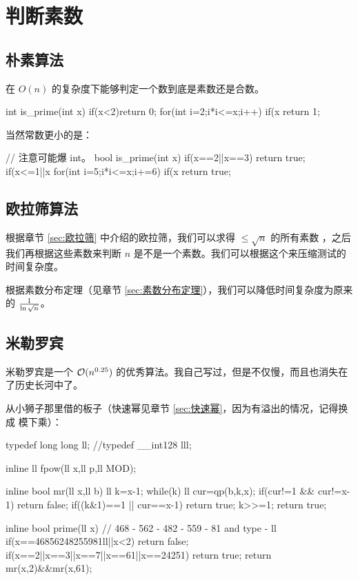 \section{判断素数}\label{sec:判断素数}
\subsection{朴素算法}
在 $O(n)$ 的复杂度下能够判定一个数到底是素数还是合数。
\begin{Cpp}
int is_prime(int x){
    if(x<2)return 0;
    for(int i=2;i*i<=x;i++){
        if(x%
    }
    return 1;
}
\end{Cpp}

当然常数更小的是：
\begin{Cpp}
// 注意可能爆 int。
bool is_prime(int x){
    if(x==2||x==3) return true;
    if(x<=1||x%
    for(int i=5;i*i<=x;i+=6){
        if(x%
    }
    return true;
}
\end{Cpp}

\subsection{欧拉筛算法}
根据章节 \ref{sec:欧拉筛} 中介绍的欧拉筛，我们可以求得 $\le \sqrt n$ 的所有素数
，之后我们再根据这些素数来判断 $n$ 是不是一个素数。我们可以根据这个来压缩测试的
时间复杂度。

根据素数分布定理（见章节 \ref{sec:素数分布定理}），我们可以降低时间复杂度为原来
的 $1 \over \ln \sqrt n$。

\subsection{米勒罗宾}
米勒罗宾是一个 $\mathcal{O}(n^{0.25})$ 的优秀算法。我自己写过，但是不仅慢，而且也消失在
了历史长河中了。

从小狮子那里借的板子（快速幂见章节 \ref{sec:快速幂}，因为有溢出的情况，记得换成
模下乘）：
\begin{Cpp}
typedef long long ll;
//typedef __int128 lll;

inline ll fpow(ll x,ll p,ll MOD);

inline bool mr(ll x,ll b){
  ll k=x-1;
  while(k){
    ll cur=qp(b,k,x);
    if(cur!=1 && cur!=x-1)
      return false;
    if((k&1)==1 || cur==x-1)
      return true;
    k>>=1;
  }
  return true;
}

inline bool prime(ll x){
  // 468 - 562 - 482 - 559 - 81 and type - ll
  if(x==46856248255981ll||x<2)
    return false;
  if(x==2||x==3||x==7||x==61||x==24251)
    return true;
  return mr(x,2)&&mr(x,61);
}
\end{Cpp}
